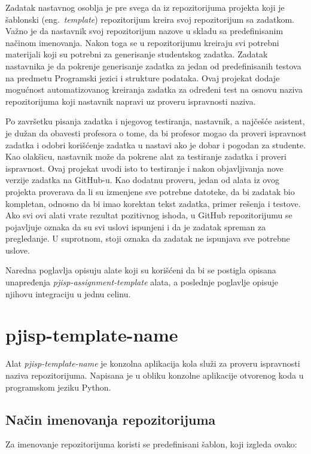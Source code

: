 \documentclass[12pt]{report}
\begin{document}
Zadatak nastavnog osoblja je pre svega da iz repozitorijuma projekta koji je šablonski (eng.\ \textit{template}) repozitorijum kreira svoj repozitorijum sa zadatkom. Važno je da nastavnik svoj repozitorijum nazove u skladu sa predefinisanim načinom imenovanja. Nakon toga se u repozitorijumu kreiraju svi potrebni materijali koji su potrebni za generisanje studentskog zadatka. Zadatak nastavnika je da pokrenje generisanje zadatka za jedan od predefinisanih testova na predmetu Programski jezici i strukture podataka. Ovaj projekat dodaje mogućnost automatizovanog kreiranja zadatka za određeni test na osnovu naziva repozitorijuma koji nastavnik napravi uz proveru ispravnosti naziva.

Po završetku pisanja zadatka i njegovog testiranja, nastavnik, a najčešće asistent, je dužan da obavesti profesora o tome, da bi profesor mogao da proveri ispravnost zadatka i odobri korišćenje zadatka u nastavi ako je dobar i pogodan za studente. Kao olakšicu, nastavnik može da pokrene alat za testiranje zadatka i proveri ispravnost. Ovaj projekat uvodi isto to testiranje i nakon objavljivanja nove verzije zadatka na GitHub-u. Kao dodatnu proveru, jedan od alata iz ovog projekta proverava da li su izmenjene sve potrebne datoteke, da bi zadatak bio kompletan, odnosno da bi imao korektan tekst zadatka, primer rešenja i testove. Ako svi ovi alati vrate rezultat pozitivnog ishoda, u GitHub repozitorijumu se pojavljuje oznaka da su svi uslovi ispunjeni i da je zadatak spreman za pregledanje. U suprotnom, stoji oznaka da zadatak ne ispunjava sve potrebne uslove.

Naredna poglavlja opisuju alate koji su korišćeni da bi se postigla opisana unapređenja \textit{pjisp-assignment-template} alata, a poslednje poglavlje opisuje njihovu integraciju u jednu celinu.

\section{pjisp-template-name}
Alat \textit{pjisp-template-name} \cite{pjisp-template-name} je konzolna aplikacija kola služi za proveru ispravnosti naziva repozitorijuma. Napisana je u obliku konzolne aplikacije otvorenog koda u programskom jeziku Python.

\subsection{Način imenovanja repozitorijuma}
Za imenovanje repozitorijuma koristi se predefinisani šablon, koji izgleda ovako:
\end{document}
